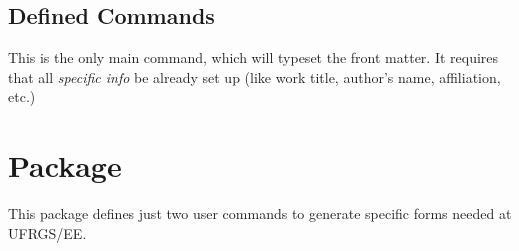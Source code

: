 \documentclass[dctools,english,tocdepth=3,secdepth=3]{ufrgscca} %
\begin{document}
\subsection{Defined Commands}
\begin{Macros}{\maketitle}
	\begin{Syntax}%
		\Macro{\maketitle}{}
	\end{Syntax}
This is the only main command, which will typeset the front matter. It requires that all \emph{specific info} be already set up (like work title, author's name, affiliation, etc.)
\end{Macros}



\section{ Package}
This package defines just two user commands to generate specific forms needed at UFRGS/EE.
\end{document}
